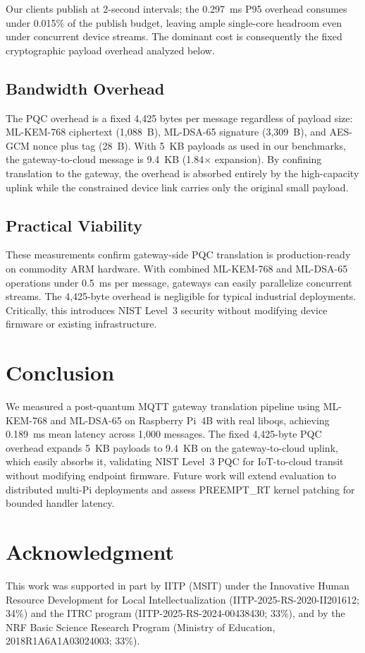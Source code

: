 \documentclass[conference]{IEEEtran}
\begin{document}
Our clients publish at 2-second intervals; the 0.297~ms P95 overhead consumes under 0.015\% of the publish budget, leaving ample single-core headroom even under concurrent device streams. The dominant cost is consequently the fixed cryptographic payload overhead analyzed below.

\subsection{Bandwidth Overhead}

The PQC overhead is a fixed 4,425 bytes per message regardless of payload size: ML-KEM-768 ciphertext (1,088~B), ML-DSA-65 signature (3,309~B), and AES-GCM nonce plus tag (28~B). With 5~KB payloads as used in our benchmarks, the gateway-to-cloud message is 9.4~KB (1.84$\times$ expansion). By confining translation to the gateway, the overhead is absorbed entirely by the high-capacity uplink while the constrained device link carries only the original small payload.

\subsection{Practical Viability}

These measurements confirm gateway-side PQC translation is production-ready on commodity ARM hardware. With combined ML-KEM-768 and ML-DSA-65 operations under 0.5~ms per message, gateways can easily parallelize concurrent streams. The 4,425-byte overhead is negligible for typical industrial deployments. Critically, this introduces NIST Level~3 security without modifying device firmware or existing infrastructure.

\section{Conclusion}

We measured a post-quantum MQTT gateway translation pipeline using ML-KEM-768 and ML-DSA-65 on Raspberry Pi~4B with real liboqs, achieving 0.189~ms mean latency across 1,000 messages. The fixed 4,425-byte PQC overhead expands 5~KB payloads to 9.4~KB on the gateway-to-cloud uplink, which easily absorbs it, validating NIST Level~3 PQC for IoT-to-cloud transit without modifying endpoint firmware. Future work will extend evaluation to distributed multi-Pi deployments and assess PREEMPT\_RT kernel patching for bounded handler latency.

\section*{Acknowledgment}
This work was supported in part by IITP (MSIT) under the Innovative Human Resource Development for Local Intellectualization (IITP-2025-RS-2020-II201612; 34\%) and the ITRC program (IITP-2025-RS-2024-00438430; 33\%), and by the NRF Basic Science Research Program (Ministry of Education, 2018R1A6A1A03024003; 33\%).
\balance
\end{document}
